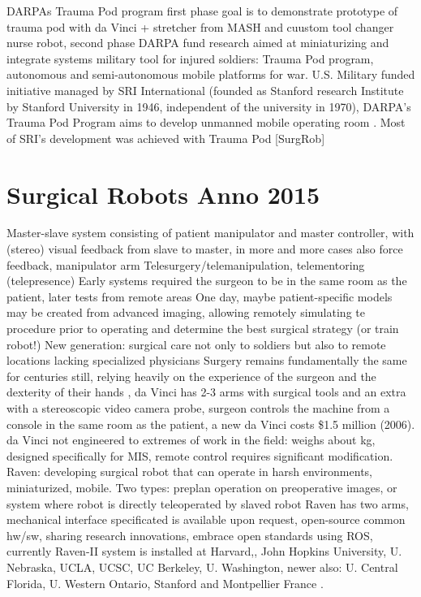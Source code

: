 DARPAs Trauma Pod program first phase goal is to demonstrate prototype of trauma pod with da Vinci + stretcher from MASH and cuustom tool changer nurse robot, second phase DARPA fund research aimed at miniaturizing and integrate systems \citep{bib:docatadist}
military tool for injured soldiers: Trauma Pod program, autonomous and semi-autonomous mobile platforms for war.
U.S. Military funded initiative managed by SRI International (founded as Stanford research Institute by Stanford University in 1946, independent of the university in 1970), DARPA's Trauma Pod Program aims to develop unmanned mobile operating room \citep{bib:docatadist}. Most of SRI's development was achieved with Trauma Pod [SurgRob]



\section{Surgical Robots Anno 2015}
Master-slave system consisting of patient manipulator and master controller, with (stereo) visual feedback from slave to master, in more and more cases also force feedback, manipulator arm
Telesurgery/telemanipulation, telementoring (telepresence)
Early systems required the surgeon to be in the same room as the patient, later tests from remote areas
One day, maybe patient-specific models may be created from advanced imaging, allowing  remotely simulating te procedure prior to operating and determine the best surgical strategy (or train robot!)
New generation: surgical care not only to soldiers but also to remote locations lacking specialized physicians
Surgery remains fundamentally the same for centuries still, relying heavily on the experience of the surgeon and the dexterity of their hands \citep{bib:docatadist},
da Vinci has 2-3 arms with surgical tools and an extra with a stereoscopic video camera probe, surgeon controls the machine from a console in the same room as the patient, a new da Vinci costs \$1.5 million (2006).
da Vinci not engineered to extremes of work in the field: weighs about  kg, designed specifically for MIS, remote control requires significant modification.
Raven: developing surgical robot that can operate in harsh environments, miniaturized, mobile.
Two types: preplan operation on preoperative images, or system where robot is directly teleoperated by slaved robot
Raven has two arms, mechanical interface specificated is available upon request, open-source common hw/sw, sharing research innovations, embrace open standards \citep{bib:raven_ii} using ROS, currently Raven-II system is installed at Harvard,, John Hopkins University, U. Nebraska, UCLA, UCSC, UC Berkeley, U. Washington, newer also: U. Central Florida, U. Western Ontario, Stanford and Montpellier France \citep{bib:raven_ii}.
